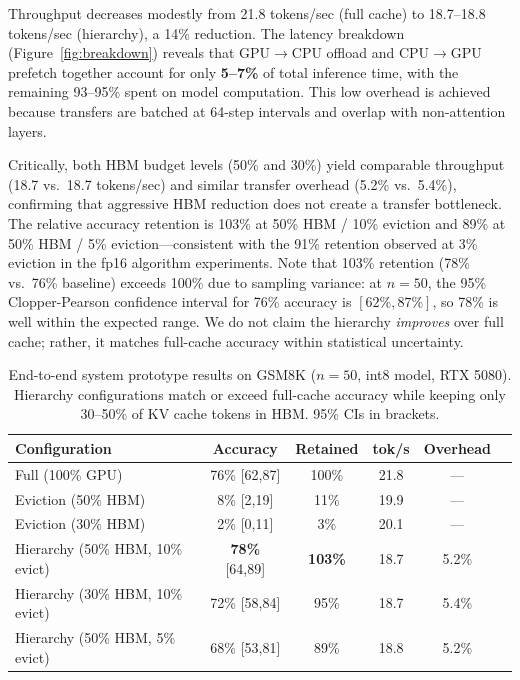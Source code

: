 \documentclass{article}
\begin{document}
Throughput decreases modestly from 21.8 tokens/sec (full cache) to 18.7--18.8 tokens/sec (hierarchy), a 14\% reduction.
The latency breakdown (Figure~\ref{fig:breakdown}) reveals that GPU$\to$CPU offload and CPU$\to$GPU prefetch together account for only \textbf{5--7\%} of total inference time, with the remaining 93--95\% spent on model computation.
This low overhead is achieved because transfers are batched at 64-step intervals and overlap with non-attention layers.

Critically, both HBM budget levels (50\% and 30\%) yield comparable throughput (18.7 vs.\ 18.7 tokens/sec) and similar transfer overhead (5.2\% vs.\ 5.4\%), confirming that aggressive HBM reduction does not create a transfer bottleneck.
The relative accuracy retention is 103\% at 50\% HBM / 10\% eviction and 89\% at 50\% HBM / 5\% eviction---consistent with the 91\% retention observed at 3\% eviction in the fp16 algorithm experiments.
Note that 103\% retention (78\% vs.\ 76\% baseline) exceeds 100\% due to sampling variance: at $n{=}50$, the 95\% Clopper-Pearson confidence interval for 76\% accuracy is $[62\%, 87\%]$, so 78\% is well within the expected range.
We do not claim the hierarchy \emph{improves} over full cache; rather, it matches full-cache accuracy within statistical uncertainty.

\begin{table}[t]
\centering
\caption{End-to-end system prototype results on GSM8K ($n=50$, int8 model, RTX 5080).
Hierarchy configurations match or exceed full-cache accuracy while keeping only 30--50\% of KV cache tokens in HBM. 95\% CIs in brackets.}
\label{tab:e2e}
\vskip 0.1in
\small
\begin{tabular}{lccccc}
\toprule
\textbf{Configuration} & \textbf{Accuracy} & \textbf{Retained} & \textbf{tok/s} & \textbf{Overhead} \\
\midrule
Full (100\% GPU) & 76\% {\scriptsize[62,87]} & 100\% & 21.8 & --- \\
\midrule
Eviction (50\% HBM) & 8\% {\scriptsize[2,19]} & 11\% & 19.9 & --- \\
Eviction (30\% HBM) & 2\% {\scriptsize[0,11]} & 3\% & 20.1 & --- \\
\midrule
Hierarchy (50\% HBM, 10\% evict) & \textbf{78\%} {\scriptsize[64,89]} & \textbf{103\%} & 18.7 & 5.2\% \\
Hierarchy (30\% HBM, 10\% evict) & 72\% {\scriptsize[58,84]} & 95\% & 18.7 & 5.4\% \\
Hierarchy (50\% HBM, 5\% evict) & 68\% {\scriptsize[53,81]} & 89\% & 18.8 & 5.2\% \\
\bottomrule
\end{tabular}
\end{table}
\end{document}
